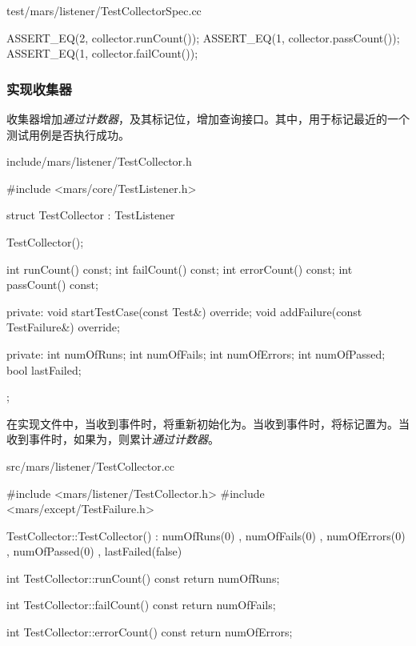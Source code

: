 \begin{content}
\begin{nodiff}{test/mars/listener/TestCollectorSpec.cc}
\begin{c++}
{  ASSERT_EQ(2, collector.runCount());
  ASSERT_EQ(1, collector.passCount());
  ASSERT_EQ(1, collector.failCount());
}
 \end{c++}
\end{nodiff}

\subsubsection{实现收集器}

收集器增加\emph{通过计数器}，及其标记位，增加查询接口。其中，用于标记最近的一个测试用例是否执行成功。

\begin{nodiff}{include/mars/listener/TestCollector.h}
 \begin{c++}
#include <mars/core/TestListener.h>

struct TestCollector : TestListener {
  TestCollector();

  int runCount() const;
  int failCount() const;
  int errorCount() const;
  int passCount() const;

private:
  void startTestCase(const Test&) override;
  void addFailure(const TestFailure&) override;

private:
  int numOfRuns;
  int numOfFails;
  int numOfErrors;
  int numOfPassed;
  bool lastFailed;
};
 \end{c++}
\end{nodiff}

在实现文件中，当收到事件时，将重新初始化为。当收到事件时，将标记置为。当收到事件时，如果为，则累计\emph{通过计数器}。

\begin{nodiff}{src/mars/listener/TestCollector.cc}
 \begin{c++}
#include <mars/listener/TestCollector.h>
#include <mars/except/TestFailure.h>

TestCollector::TestCollector()
  : numOfRuns(0)
  , numOfFails(0)
  , numOfErrors(0)
  , numOfPassed(0)
  , lastFailed(false) {}

int TestCollector::runCount() const {
  return numOfRuns;
}

int TestCollector::failCount() const {
  return numOfFails;
}

int TestCollector::errorCount() const {
  return numOfErrors;
}


\end{c++}
\end{nodiff}
\end{content}
